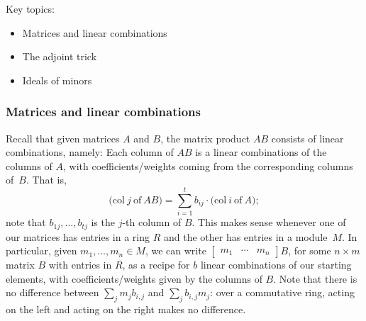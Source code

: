 \documentclass[12pt]{amsart}
\newcommand{\0}{$\phantom{.}$}
\newcommand{\1}{\mathbbm{1}}
\begin{document}
\begin{framed} Key topics:
\begin{itemize}
\item Matrices and linear combinations
\item The adjoint trick
\item Ideals of minors
\end{itemize}
\end{framed}

\subsubsection*{Matrices and linear combinations} Recall that given matrices $A$ and $B$, the matrix product $AB$ consists of linear combinations, namely:
Each column of $AB$ is a linear combinations of the columns of $A$, with coefficients/weights coming from the corresponding columns of~$B$. That is,
 \[ \big(\mathrm{col} \ j \ \text{of} \ AB\big) = \sum_{i=1}^t b_{ij} \cdot  \big(\mathrm{col} \ i \ \text{of} \ A);\]
 note that $b_{1j},\dots,b_{tj}$ is the $j$-th column of $B$.
 This makes sense whenever one of our matrices has entries in a ring $R$ and the other has entries in a module~$M$. In particular, given $m_1,\dots,m_n \in M$, we can write $\begin{bmatrix} m_1& \cdots & m_n \end{bmatrix} B$, for some $n\times m$ matrix $B$ with entries in $R$, as a recipe for $b$ linear combinations of our starting elements, with coefficients/weights given by the columns of $B$. Note that there is no difference between $\sum_j m_j b_{i,j}$ and $\sum_j b_{i,j}m_j$: over a commutative ring, acting on the left and acting on the right makes no difference.
 
\end{document}
